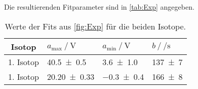 Die resultierenden Fitparameter sind in \autoref{tab:Exp} angegeben.
\begin{table}
  \centering
  \caption{Werte der Fits aus \autoref{fig:Exp} für die beiden Isotope.}
  \label{tab:Exp}
  \begin{tabular}{c l l l}
    \toprule
    {Isotop} & $a_{\text{max}} \mathbin{/} \unit{\volt}$ & $a_{\text{min}} \mathbin{/} \unit{\volt}$ & $b \mathbin{/} \unit{\per\second}$ \\
    \midrule
    1. Isotop & \num{40.5+-0.5} & \num{3.6+-1.0} & \num{137+-7} \\
    1. Isotop & \num{20.20+-0.33} & \num{-0.3+-0.4} & \num{166+-8} \\
    \bottomrule
  \end{tabular}
\end{table}
